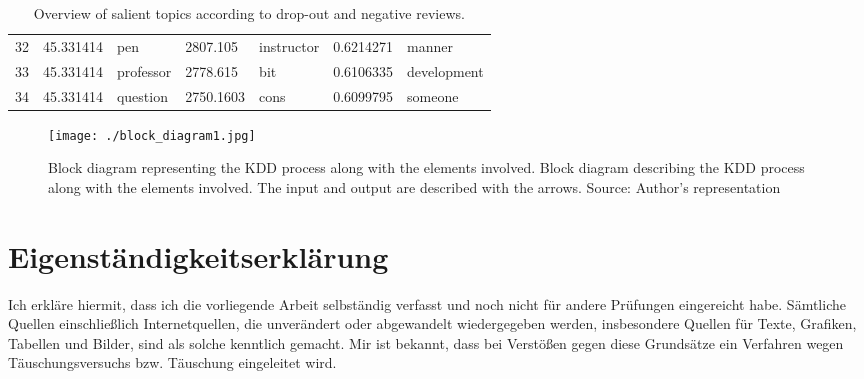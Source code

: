 \documentclass[
	a4paper,
	pdftex,
	12pt,	
	footinclude=true,
	fleqn,
	final,
	]{report}%
\begin{document}
\begin{table}[]
{\begin{tabular}{l|ll|ll|ll}
32 & 45.331414       & pen              & 2807.105            & instructor       & 0.6214271  & manner           \\
33 & 45.331414       & professor        & 2778.615            & bit              & 0.6106335  & development      \\
34 & 45.331414       & question         & 2750.1603           & cons             & 0.6099795  & someone          \\ \bottomrule
\end{tabular}%
}
\caption[Relevant factors associated with student dissatisfaction.]{\small \centering Overview of salient topics according to drop-out and negative reviews.}
\label{t:factors}
\end{table}

\newpage
\begin{sidewaysfigure}[h]
 \centering
 \texttt{[image: ./block\_diagram1.jpg]}%
 \caption[Block diagram of the implementation]{\small \centering Block diagram representing the KDD process along with the elements involved. Block diagram describing the KDD 
 process along with the elements involved. The input and output are described with the arrows. Source: Author's representation} 
 \label{fig:1}
\end{sidewaysfigure}
\newpage
\chapter*{Eigenst\"{a}ndigkeitserkl\"{a}rung}

Ich erkl\"{a}re hiermit, dass ich die vorliegende Arbeit selbst\"{a}ndig verfasst und noch nicht
f\"{u}r andere Pr\"{u}fungen eingereicht habe. S\"{a}mtliche Quellen einschließlich Internetquellen,
die unver\"{a}ndert oder abgewandelt wiedergegeben werden, insbesondere Quellen f\"{u}r
Texte, Grafiken, Tabellen und Bilder, sind als solche kenntlich gemacht. Mir ist bekannt,
dass bei Verst\"{o}ßen gegen diese Grunds\"{a}tze ein Verfahren wegen T\"{a}uschungsversuchs
bzw. T\"{a}uschung eingeleitet wird.
\vspace{3cm}
\newcommand*{\SignatureAndDate}[1]{%
    \par\noindent\makebox[2.5in]{\hrulefill} \hfill\makebox[2.0in]{\hrulefill}%
    \par\noindent\makebox[2.5in][l]{#1}      \hfill{}%
}%
\SignatureAndDate{Datum, Ort}
\end{document}
